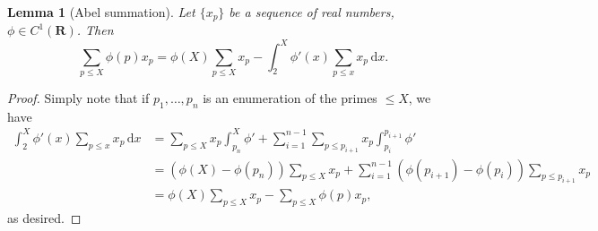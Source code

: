 \documentclass{article}
\newcommand{\bR}{\mathbf{R}}
\newcommand{\dd}{\mathrm{d}}
\newtheorem{lemma}[theorem]{Lemma}
\theoremstyle{definition}
\numberwithin{theorem}{section}
\begin{document}
\begin{lemma}[Abel summation]
Let $\{x_p\}$ be a sequence of real numbers, $\phi\in C^1(\bR)$. Then 
\[
	\sum_{p\leqslant X} \phi(p) x_p = \phi(X) \sum_{p\leqslant X} x_p - \int_2^X \phi'(x) \sum_{p\leqslant x} x_p\, \dd x .
\]
\end{lemma}
\begin{proof}
Simply note that if $p_1,\dots,p_n$ is an enumeration of the primes 
$\leqslant X$, we have 
\begin{align*}
	\int_2^X \phi'(x) \sum_{p\leqslant x} x_p\, \dd x 
		&= \sum_{p\leqslant X} x_p\int_{p_n}^X \phi' + \sum_{i=1}^{n-1} \sum_{p\leqslant p_{i+1}}x_p\int_{p_i}^{p_{i+1}} \phi' \\
		&= (\phi(X)-\phi(p_n))\sum_{p\leqslant X} x_p + \sum_{i=1}^{n-1} (\phi(p_{i+1})-\phi(p_i)) \sum_{p\leqslant p_{i+1}} x_p \\
		&= \phi(X) \sum_{p\leqslant X} x_p - \sum_{p\leqslant X} \phi(p) x_p ,
\end{align*}
as desired.
\end{proof}
\end{document}
